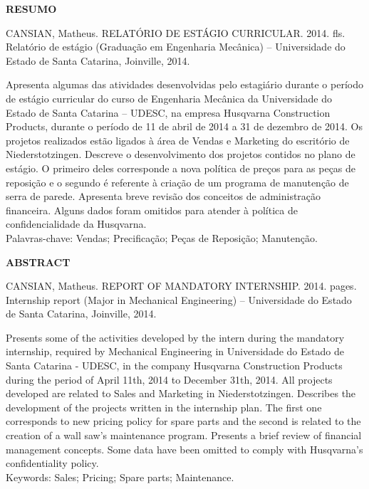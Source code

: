 \documentclass[12pt]{article}
\begin{document}
{
	
	
	\begin{center}
	{
		\bf RESUMO
	}\\[3cm]
	\end{center} 
	
	\begin{flushleft}
	{
		\noindent
		CANSIAN, Matheus. RELATÓRIO DE ESTÁGIO CURRICULAR. 2014. \pageref{LastPage} fls. Relatório de estágio (Graduação em Engenharia Mecânica) – Universidade do Estado de Santa Catarina, Joinville, 2014. 
	}\\[2cm]
	\end{flushleft}
	
	{
		\noindent
		Apresenta algumas das atividades desenvolvidas pelo estagiário durante o período de estágio curricular do curso de Engenharia Mecânica da Universidade do Estado de Santa Catarina – UDESC, na empresa Husqvarna Construction Products, durante o período de 11 de abril de 2014 a 31 de dezembro de 2014. Os projetos realizados estão ligados à área de Vendas e Marketing do escritório de Niederstotzingen. Descreve o desenvolvimento dos projetos contidos no plano de estágio. O primeiro deles corresponde a nova política de preços para as peças de reposição e o segundo é referente à criação de um programa de manutenção de serra de parede. Apresenta breve revisão dos conceitos de administração financeira. Alguns dados foram omitidos para atender à política de confidencialidade da Husqvarna.
	}\\[1cm]

	{
		\noindent
		Palavras-chave: Vendas; Precificação; Peças de Reposição; Manutenção.
	}
}
\pagebreak

{
	\noindent
	
	\begin{center}
	{
		\bf ABSTRACT
	}\\[3cm]
	\end{center} 
	
	\begin{flushleft}
	{
		\noindent
		CANSIAN, Matheus. REPORT OF MANDATORY INTERNSHIP. 2014. \pageref{LastPage} pages. Internship report (Major in Mechanical Engineering) – Universidade do Estado de Santa Catarina, Joinville, 2014. 
	}\\[2cm]
	\end{flushleft}
	
	{
		\noindent
		Presents some of the activities developed by the intern during the mandatory internship, required by Mechanical Engineering in Universidade do Estado de Santa Catarina - UDESC, in the company Husqvarna Construction Products during the period of April 11th, 2014 to December 31th, 2014. All projects developed are related to Sales and Marketing in Niederstotzingen. Describes the development of the projects written in the internship plan. The first one corresponds to new pricing policy for spare parts and the second is related to the creation of a wall saw's maintenance program. Presents a brief review of financial management concepts. Some data have been omitted to comply with Husqvarna's confidentiality policy.
	}\\[1cm]
	

	{
		\noindent
		Keywords: Sales; Pricing; Spare parts; Maintenance.
	}
}
\pagebreak
\end{document}
